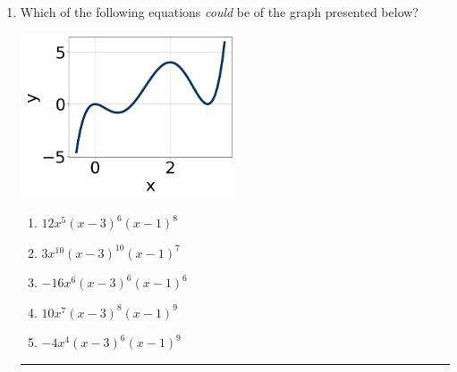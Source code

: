 \documentclass[14pt]{extbook}
\newcommand{\litem}[1]{\item#1\hspace*{-1cm}\rule{\textwidth}{0.4pt}}
\begin{document}
\begin{enumerate}
\litem{
Which of the following equations \textit{could} be of the graph presented below?
\begin{center}
    \includegraphics[width=0.5\textwidth]{../Figures/polyGraphToFunctionCopyA.png}
\end{center}
\begin{enumerate}[label=\Alph*.]
\item \( 12x^{5} (x - 3)^{6} (x - 1)^{8} \)
\item \( 3x^{10} (x - 3)^{10} (x - 1)^{7} \)
\item \( -16x^{6} (x - 3)^{6} (x - 1)^{6} \)
\item \( 10x^{7} (x - 3)^{8} (x - 1)^{9} \)
\item \( -4x^{4} (x - 3)^{6} (x - 1)^{9} \)


\end{enumerate}}
\end{enumerate}
\end{document}
